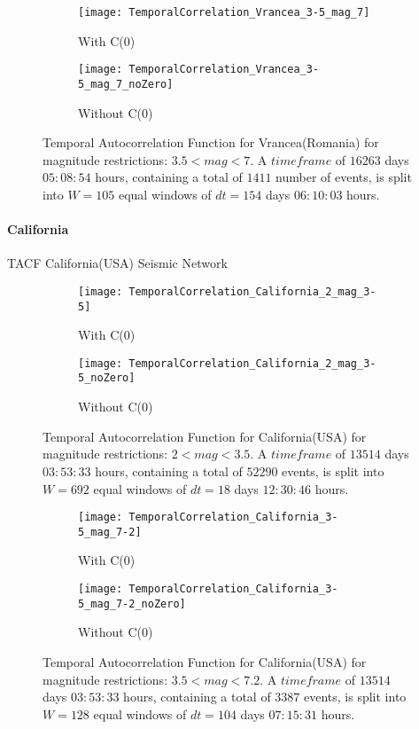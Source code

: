 \begin{figure}[!ht]
\begin{subfigure}{.5\textwidth}
  \centering
  \texttt{[image: TemporalCorrelation\_Vrancea\_3-5\_mag\_7]}
  \caption{With C(0)}
  \label{fig:corrVrancea3.5_7}
\end{subfigure}%
\begin{subfigure}{.5\textwidth}
  \centering
  \texttt{[image: TemporalCorrelation\_Vrancea\_3-5\_mag\_7\_noZero]}
  \caption{Without C(0)}
  \label{fig:corrVrancea3.5_7_noZero}
\end{subfigure}
\caption{Temporal Autocorrelation Function for Vrancea(Romania) for magnitude restrictions: $3.5<mag<7$. A $timeframe$ of $16263$ days $05:08:54$ hours, containing a total of $1411$ number of events, is split into $W=105$ equal windows of $dt=154$ days $06:10:03$ hours.}
\label{fig:corrVrancea3.5_7!}
\end{figure}


\clearpage
\paragraph{California} TACF California(USA) Seismic Network

\begin{figure}[!ht]
\begin{subfigure}{.5\textwidth}
  \centering
  \texttt{[image: TemporalCorrelation\_California\_2\_mag\_3-5]}
  \caption{With C(0)}
  \label{fig:corrCalifornia2_3.5}
\end{subfigure}%
\begin{subfigure}{.5\textwidth}
  \centering
  \texttt{[image: TemporalCorrelation\_California\_2\_mag\_3-5\_noZero]}
  \caption{Without C(0)}
  \label{fig:corrCalifornia2_3.5_noZero}
\end{subfigure}
\caption{Temporal Autocorrelation Function for California(USA) for magnitude restrictions: $2<mag<3.5$. A $timeframe$ of $13514$ days $03:53:33$ hours, containing a total of $52290$ events, is split into $W=692$ equal windows of $dt=18$ days $12:30:46$ hours.}
\label{fig:corrCalifornia2_3.5!}
\end{figure}

\begin{figure}[!ht]
\begin{subfigure}{.5\textwidth}
  \centering
  \texttt{[image: TemporalCorrelation\_California\_3-5\_mag\_7-2]}
  \caption{With C(0)}
  \label{fig:corrCalifornia3.5_7}
\end{subfigure}%
\begin{subfigure}{.5\textwidth}
  \centering
  \texttt{[image: TemporalCorrelation\_California\_3-5\_mag\_7-2\_noZero]}
  \caption{Without C(0)}
  \label{fig:corrCalifornia3.5_7_noZero}
\end{subfigure}
\caption{Temporal Autocorrelation Function for California(USA) for magnitude restrictions: $3.5<mag<7.2$. A $timeframe$ of $13514$ days $03:53:33$ hours, containing a total of $3387$ events, is split into $W=128$ equal windows of $dt=104$ days $07:15:31$ hours.}
\label{fig:corrCalifornia3.5_7!}
\end{figure}



